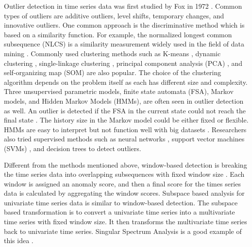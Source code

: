 Outlier detection in time series data was first studied by Fox in 1972
\cite{fox1972outliers}. Common types of outliers are additive outliers,
level shifts, temporary changes, and innovative outliers. One common
approach is the discriminative method which is based on a similarity
function. For example, the normalized longest common subsequence
(NLCS) is a similarity measurement widely used in the field of data
mining \cite{budalakoti2009anomaly, chandola2008comparative,
sequeira2002admit}. Commonly used clustering methods such as
K-means \cite{macqueen1967some}, dynamic clustering
\cite{sequeira2002admit}, single-linkage clustering
\cite{portnoy2001intrusion}, principal component analysis (PCA)
\cite{gupta2013context}, and self-organizing map (SOM)
\cite{gonzalez2003anomaly} are also popular. The choice of the
clustering algorithm depends on the problem itself as each has
different size and complexity. Three unsupervised parametric models,
finite state automata (FSA), Markov models, and Hidden Markov Models
(HMMs), are often seen in outlier detection as well. An outlier is
detected if the FSA in the current state could not reach the final
state \cite{chandola2008comparative}. The history size in the Markov
model could be either fixed or flexible. HMMs are easy to interpret
but not function well with big datasets
\cite{chandola2008comparative}. Researchers also tried supervised
methods such as neural networks \cite{dasgupta2000comparison},
support vector machines (SVMs) \cite{li2006motion}, and decision
trees \cite{kang2005learning} to detect outliers.

Different from the methods mentioned above, window-based detection is
breaking the time series data into overlapping subsequences with fixed
window size \cite{cheboli2010anomaly}. Each window is assigned an
anomaly score, and then a final score for the times series data is
calculated by aggregating the window scores. Subspace based analysis for
univariate time series data is similar to window-based detection. The
subspace based transformation is to convert a univariate time series
into a multivariate time series with fixed window size. It then
transforms the multivariate time series back to univariate time series.
Singular Spectrum Analysis is a good example of this idea
\cite{golyandina2013singular}.

